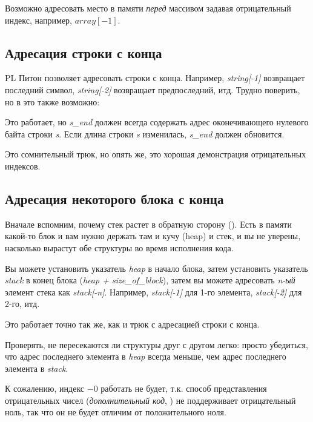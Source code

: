 \label{negative_array_indices}

Возможно адресовать место в памяти \emph{перед} массивом задавая отрицательный индекс, например, $array[-1]$.

\subsection{Адресация строки с конца}

\ac{PL} Питон позволяет адресовать строки с конца.
Например, \emph{string[-1]} возвращает последний символ, \emph{string[-2]} возвращает предпоследний, итд.
Трудно поверить, но в \CCpp это также возможно:



Это работает, но \textit{s\_end} должен всегда содержать адрес оконечивающего нулевого байта строки \textit{s}.
Если длина строки \textit{s} изменилась, \textit{s\_end} должен обновится.

Это сомнительный трюк, но опять же, это хорошая демонстрация отрицательных индексов.

\subsection{Адресация некоторого блока с конца}

Вначале вспомним, почему стек растет в обратную сторону ().
Есть в памяти какой-то блок и вам нужно держать там и кучу (heap) и стек, и вы не уверены, насколько вырастут обе
структуры во время исполнения кода.

Вы можете установить указатель \emph{heap} в начало блока,
затем установить указатель \emph{stack} в конец блока (\emph{heap + size\_of\_block}),
затем вы можете адресовать \emph{n-ый} элемент стека как \emph{stack[-n]}.
Например, \emph{stack[-1]} для 1-го элемента, \emph{stack[-2]} для 2-го, итд.

Это работает точно так же, как и трюк с адресацией строки с конца.

Проверять, не пересекаются ли структуры друг с другом легко:
просто убедиться, что адрес последнего элемента в \emph{heap} всегда меньше, чем адрес последнего элемента в \emph{stack}.

К сожалению, индекс $-0$ работать не будет,
т.к. способ представления отрицательных чисел (\emph{дополнительный код}, )
не поддерживает отрицательный ноль,
так что он не будет отличим от положительного ноля.

